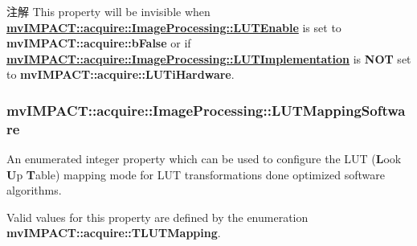 \begin{DoxyNote}{注解}
This property will be invisible when {\bfseries \hyperlink{classmv_i_m_p_a_c_t_1_1acquire_1_1_image_processing_a7f8eb83578d97fde3405e6ae5d09e5c3}{mv\+I\+M\+P\+A\+C\+T\+::acquire\+::\+Image\+Processing\+::\+L\+U\+T\+Enable}} is set to {\bfseries mv\+I\+M\+P\+A\+C\+T\+::acquire\+::b\+False} or if {\bfseries \hyperlink{classmv_i_m_p_a_c_t_1_1acquire_1_1_image_processing_ab63796c1475d375fc872f0b11a102777}{mv\+I\+M\+P\+A\+C\+T\+::acquire\+::\+Image\+Processing\+::\+L\+U\+T\+Implementation}} is {\bfseries N\+O\+T} set to {\bfseries mv\+I\+M\+P\+A\+C\+T\+::acquire\+::\+L\+U\+Ti\+Hardware}. 
\end{DoxyNote}
\hypertarget{classmv_i_m_p_a_c_t_1_1acquire_1_1_image_processing_aec5f5970518b9ad4f8659fc5dba93416}{
\subsubsection[{L\+U\+T\+Mapping\+Software}]{ mv\+I\+M\+P\+A\+C\+T\+::acquire\+::\+Image\+Processing\+::\+L\+U\+T\+Mapping\+Software}}\label{classmv_i_m_p_a_c_t_1_1acquire_1_1_image_processing_aec5f5970518b9ad4f8659fc5dba93416}


An enumerated integer property which can be used to configure the L\+U\+T ({\bfseries L}ook {\bfseries U}p {\bfseries T}able) mapping mode for L\+U\+T transformations done optimized software algorithms. 

Valid values for this property are defined by the enumeration {\bfseries mv\+I\+M\+P\+A\+C\+T\+::acquire\+::\+T\+L\+U\+T\+Mapping}.

